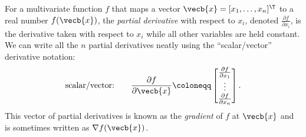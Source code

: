 For a multivariate function $f$ that maps a vector $\vecb{x} = [x_1, \dots, x_n]^\T$ to a real number $f(\vecb{x})$, the \textit{partial derivative} with respect to $x_i$, denoted $\frac{\partial f}{\partial x_i}$, is the derivative taken with respect to $x_i$ while all other variables are held constant. We can write all the $n$ partial derivatives neatly using the ``scalar/vector'' derivative notation:
\begin{equation}
	\text{scalar/vector:} \qquad \frac{\partial f}{\partial \vecb{x}} \coloneqq
	\begin{bmatrix}
		\frac{\partial f}{\partial x_1} \\
		\vdots                          \\
		\frac{\partial f}{\partial x_n}
	\end{bmatrix}. \label{eq:GradientDef}
\end{equation}
This vector of partial derivatives is known as the \textit{gradient} of $f$ at $\vecb{x}$ and is sometimes written as $\nabla f(\vecb{x})$.

